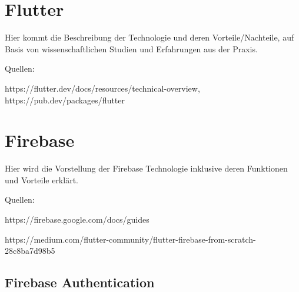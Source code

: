 




\section{Flutter}

Hier kommt die Beschreibung der Technologie und deren Vorteile/Nachteile, auf Basis von wissenschaftlichen Studien und Erfahrungen aus der Praxis.

Quellen: 

https://flutter.dev/docs/resources/technical-overview, https://pub.dev/packages/flutter





\section{Firebase}

Hier wird die Vorstellung der Firebase Technologie inklusive deren Funktionen und Vorteile erklärt.

Quellen: 

https://firebase.google.com/docs/guides 

https://medium.com/flutter-community/flutter-firebase-from-scratch-28c8ba7d98b5

\subsection{Firebase Authentication}

